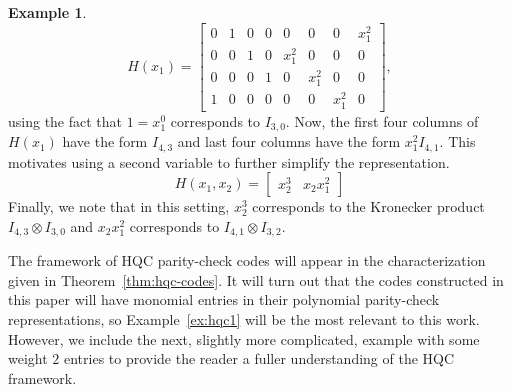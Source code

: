 \documentclass[11pt]{amsart}
\theoremstyle{definition}
\newtheorem{example}[theorem]{Example}
\newcommand{\0}{\mathbf{0}}
\begin{document}
\begin{example}
    \begin{equation}
        H(x_1) = \left[
            \begin{array}{cccc|cccc}
                0 & 1 & 0 & 0 & 0 & 0 & 0 & x_1^2 \\
                0 & 0 & 1 & 0 & x_1^2 & 0 & 0 & 0 \\
                0 & 0 & 0 & 1 & 0 & x_1^2 & 0 & 0 \\
                1 & 0 & 0 & 0 & 0 & 0 & x_1^2 & 0 
            \end{array}
        \right],
    \end{equation}
    using the fact that $1 = x_1^0$ corresponds to $I_{3,0}$. Now, the first four columns of $H(x_1)$ have the form $I_{4,3}$ and last four columns have the form $x_1^2 I_{4,1}$. This motivates using a second variable to further simplify the representation.
    \begin{equation}
        H(x_1,x_2) = \left[ \begin{array}{cc} x_2^3 & x_2 x_1^2 \end{array}\right]
    \end{equation}
    Finally, we note that in this setting, $x_2^3$ corresponds to the Kronecker product $I_{4,3} \otimes I_{3,0}$ and $x_2 x_1^2$ corresponds to $I_{4,1} \otimes I_{3,2}$.
    \end{example}

The framework of HQC parity-check codes will appear in the characterization given in Theorem~\ref{thm:hqc-codes}. It will turn out that the codes constructed in this paper will have monomial entries in their polynomial parity-check representations, so Example~\ref{ex:hqc1} will be the most relevant to this work. However, we include the next, slightly more complicated, example with some weight $2$ entries to provide the reader a fuller understanding of the HQC framework.
\end{document}
